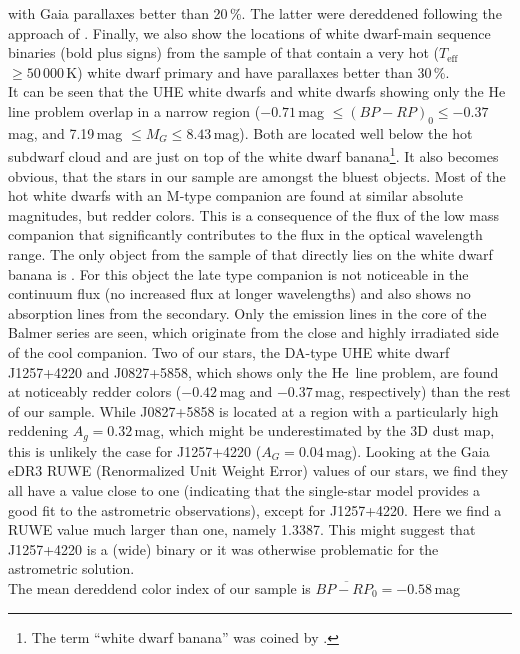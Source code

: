 \documentclass{aa}
\newcounter{Rco}
\newcommand{\Ionst}[1]{\setcounter{Rco}{#1}\Roman{Rco}}
\newcommand{\Ion}[2]{\mbox{#1\,{\scriptsize\Ionst{#2}}}}
\newcommand{\Teff}{\mbox{$T_\mathrm{eff}$}\xspace}
\begin{document}
\cite{Geier2020} with Gaia parallaxes better than 20\,\%. The latter were
dereddened following the approach of \cite{GentileFusillo+2019}. Finally,
we also show the locations of white dwarf-main sequence binaries (bold plus
signs) from the sample of \cite{Rebassa-Mansergas+2010} that contain a
very hot (\Teff$\ge 50\,000$\,K) white dwarf primary and have parallaxes
better than 30\,\%.\\
It can be seen that the UHE white dwarfs and white dwarfs showing
only the \Ion{He}{2} line problem overlap in a narrow region
($-0.71$\,mag $\leq (BP-RP)_0 \leq -0.37$\,mag, and 7.19\,mag
$\leq M_G \leq 8.43$\,mag). Both are located well below the hot subdwarf
cloud and are just on top of the white dwarf banana\footnote{The term ``white
dwarf banana'' was coined by \cite{Girven+2011}.}. It also becomes obvious, that
the stars in our sample are amongst the bluest objects. Most of the
hot white dwarfs with an M-type companion are found at similar absolute
magnitudes, but redder colors.
This is a consequence of the flux of the low mass companion that significantly
contributes to the flux in the optical wavelength range. The only object
from the sample of \cite{Rebassa-Mansergas+2010} that directly lies on the
white dwarf banana is . For this object
the late type companion is not noticeable in the continuum flux (no increased
flux at longer wavelengths) and also shows no absorption lines from the secondary.
Only the emission lines in the core of the Balmer series are seen, which
originate from the close and highly irradiated side of the cool companion.
Two of our stars, the DA-type UHE white dwarf J1257+4220 and J0827+5858, which
shows only the \Ion{He}{2} line problem, are found at noticeably redder
colors ($-0.42$\,mag and $-0.37$\,mag, respectively) than the rest of our sample.
While J0827+5858 is located at a region with a particularly high reddening
$A_g=0.32$\,mag, which might be underestimated by the 3D dust map, this is unlikely
the case for J1257+4220 ($A_G=0.04$\,mag). Looking at the Gaia eDR3 RUWE
(Renormalized Unit Weight Error) values of our stars, we find they all
have a value close to one (indicating that the single-star model provides a
good fit to the astrometric observations), except for J1257+4220. Here we find
a RUWE value much larger than one, namely 1.3387. This might suggest that J1257+4220
is a (wide) binary or it was otherwise problematic for the astrometric solution.
\\
The mean dereddend color index of our sample is $\overline{BP-RP_0}=-0.58$\,mag
\end{document}
